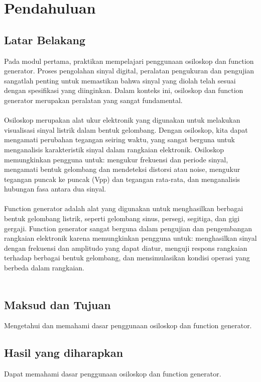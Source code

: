 \section{Pendahuluan}
\subsection{Latar Belakang}

Pada modul pertama, praktikan mempelajari penggunaan osiloskop dan function generator.
Proses pengolahan sinyal digital, peralatan pengukuran dan pengujian sangatlah penting untuk memastikan bahwa sinyal yang diolah telah sesuai dengan spesifikasi yang diinginkan. Dalam konteks ini, osiloskop dan function generator merupakan peralatan yang sangat fundamental.
\\\\
Osiloskop merupakan alat ukur elektronik yang digunakan untuk melakukan visualisasi sinyal listrik dalam bentuk gelombang. Dengan osiloskop, kita dapat mengamati perubahan tegangan seiring waktu, yang sangat berguna untuk menganalisis karakteristik sinyal dalam rangkaian elektronik.
Osiloskop memungkinkan pengguna untuk: mengukur frekuensi dan periode sinyal, mengamati bentuk gelombang dan mendeteksi distorsi atau noise, mengukur tegangan puncak ke puncak (Vpp) dan tegangan rata-rata, dan menganalisis hubungan fasa antara dua sinyal.
\\\\
Function generator adalah alat yang digunakan untuk menghasilkan berbagai bentuk gelombang listrik, seperti gelombang sinus, persegi, segitiga, dan gigi gergaji. 
Function generator sangat berguna dalam pengujian dan pengembangan rangkaian elektronik karena memungkinkan pengguna untuk: menghasilkan sinyal dengan frekuensi dan amplitudo yang dapat diatur, menguji respons rangkaian terhadap berbagai bentuk gelombang, dan mensimulasikan kondisi operasi yang berbeda dalam rangkaian.
\\\\

\subsection{Maksud dan Tujuan}
Mengetahui dan memahami dasar penggunaan osiloskop dan function generator.

\subsection{Hasil yang diharapkan}
Dapat memahami dasar penggunaan osiloskop dan function generator.

